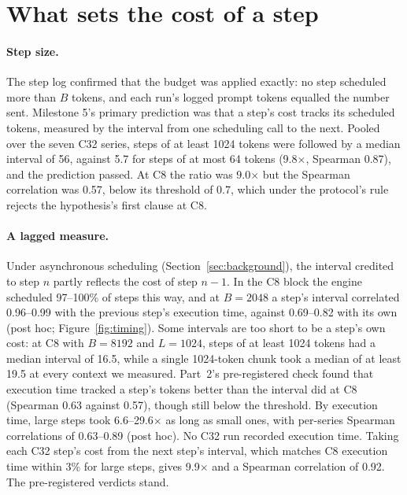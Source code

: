 \section{What sets the cost of a step}
\label{sec:stepcost}

\paragraph{Step size.}
The step log confirmed that the budget was applied exactly: no step scheduled more
than $B$ tokens, and each run's logged prompt tokens equalled the number sent.
Milestone 5's primary prediction was that a step's cost tracks its scheduled tokens,
measured by the interval from one scheduling call to the next. Pooled over the seven
C32 series, steps of at least 1024 tokens were followed by a median interval of 56\ms,
against 5.7\ms{} for steps of at most 64 tokens (9.8$\times$, Spearman 0.87), and the
prediction passed. At C8 the ratio was 9.0$\times$ but the Spearman correlation was
0.57, below its threshold of 0.7, which under the protocol's rule rejects the
hypothesis's first clause at C8.

\paragraph{A lagged measure.}
Under asynchronous scheduling (Section~\ref{sec:background}), the interval credited
to step $n$ partly reflects the cost of step $n{-}1$. In the C8
block the engine scheduled 97--100\% of steps this way, and at $B{=}2048$ a step's
interval correlated 0.96--0.99 with the previous step's execution time, against
0.69--0.82 with its own (post hoc; Figure~\ref{fig:timing}). Some intervals are too
short to be a step's own cost: at C8 with $B{=}8192$ and $L{=}1024$, steps of at least
1024 tokens had a median interval of 16.5\ms, while a single 1024-token chunk took a
median of at least 19.5\ms{} at every context we measured. Part~2's pre-registered
check found that execution time tracked a step's tokens better than the interval did
at C8 (Spearman 0.63 against 0.57), though still below the threshold. By execution
time, large steps took 6.6--29.6$\times$ as long as small ones, with per-series Spearman
correlations of 0.63--0.89 (post hoc). No C32 run recorded execution time. Taking each
C32 step's cost from the next step's interval, which matches C8 execution time within
3\% for large steps, gives 9.9$\times$ and a Spearman correlation of 0.92. The
pre-registered verdicts stand.

